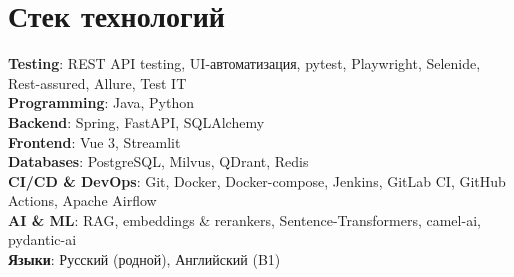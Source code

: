 \documentclass[letterpaper,12pt]{article}
\begin{document}
\section{Стек технологий}
 \begin{itemize}[leftmargin=0.15in, label={}]
    \small{\item{
     \textbf{Testing}{: REST API testing, UI-автоматизация, pytest, Playwright, Selenide, Rest-assured, Allure, Test IT} \\
     \textbf{Programming}{: Java, Python} \\
     \textbf{Backend}{: Spring, FastAPI, SQLAlchemy} \\
     \textbf{Frontend}{: Vue 3, Streamlit} \\
     \textbf{Databases}{: PostgreSQL, Milvus, QDrant, Redis} \\
     \textbf{CI/CD \& DevOps}{: Git, Docker, Docker-compose, Jenkins, GitLab CI, GitHub Actions, Apache Airflow} \\
     \textbf{AI \& ML}{: RAG, embeddings \& rerankers, Sentence-Transformers, camel-ai, pydantic-ai} \\
     \textbf{Языки}{: Русский (родной), Английский (B1)}
    }}
 \end{itemize}


\end{document}

